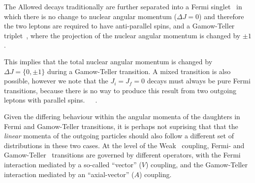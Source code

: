The Allowed decays traditionally are further separated into a Fermi singlet~ in which there is no change to nuclear angular momentum ($\Delta J = 0$) and therefore the two leptons are required to have anti-parallel spins, and a Gamow-Teller triplet~\cite{severijns_beck_cuncic_2006}, where the projection of the nuclear angular momentum is changed by $\pm1$.%

This implies that the total nuclear angular momentum is changed by $\Delta J = \{0, \pm1\}$ during a Gamow-Teller transition.  A mixed transition is also possible, however we note that the $J_i = J_f = 0$ decays must always be pure Fermi transitions, because there is no way to produce this result from two outgoing leptons with parallel spins.~\cite{krane}~\cite{wong1990}~\cite{severijns_beck_cuncic_2006}.

Given the differing behaviour within the angular momenta of the daughters in Fermi and Gamow-Teller transitions, it is perhaps not suprising that that the \emph{linear} momenta of the outgoing particles should also follow a different set of distributions in these two cases.  At the level of the Weak~ coupling, Fermi- and Gamow-Teller~ transitions are governed by different operators, with the Fermi interaction mediated by a so-called ``vector'' ($V$) coupling, and the Gamow-Teller interaction mediated by an ``axial-vector'' ($A$) coupling.
~




